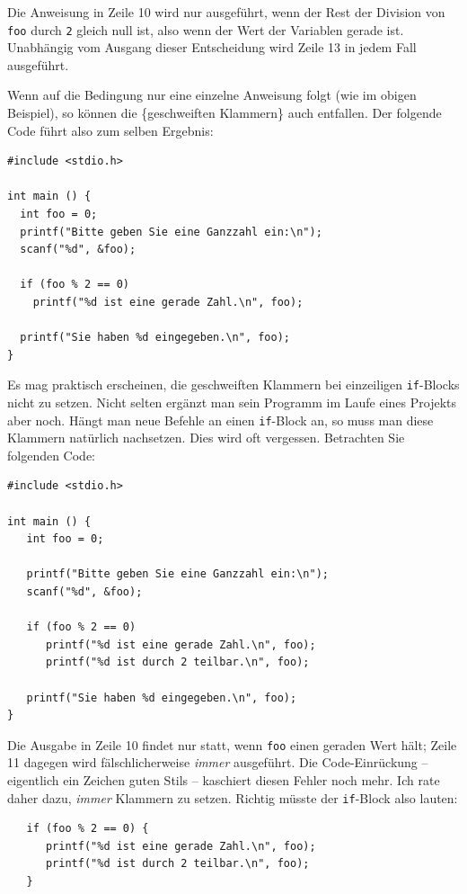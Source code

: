 Die Anweisung in Zeile 10 wird nur ausgeführt, wenn der Rest der Division von \texttt{foo} durch \texttt{2} gleich null ist, also wenn der Wert der Variablen gerade ist. Unabhängig vom Ausgang dieser Entscheidung wird Zeile 13 in jedem Fall ausgeführt.

Wenn auf die Bedingung nur eine einzelne Anweisung folgt (wie im obigen Beispiel), so können die \{geschweiften Klammern\} auch entfallen. Der folgende Code führt also zum selben Ergebnis:

\begin{codebox}
\begin{verbatim}
#include <stdio.h>

int main () {
  int foo = 0;
  printf("Bitte geben Sie eine Ganzzahl ein:\n");
  scanf("%d", &foo);

  if (foo % 2 == 0)
    printf("%d ist eine gerade Zahl.\n", foo);

  printf("Sie haben %d eingegeben.\n", foo);
}
\end{verbatim}
\end{codebox}

\begin{warnbox}
Es mag praktisch erscheinen, die geschweiften Klammern bei einzeiligen \texttt{if}-Blocks nicht zu setzen. Nicht selten ergänzt man sein Programm im Laufe eines Projekts aber noch. Hängt man neue Befehle an einen \texttt{if}-Block an, so muss man diese Klammern natürlich nachsetzen. Dies wird oft vergessen. Betrachten Sie folgenden Code:

\begin{warnbox}[Beispiel: Fehlerhafter \texttt{if}-Block durch fehlende Klammern, leftupper=7mm]
\begin{verbatim}
#include <stdio.h>

int main () {
   int foo = 0;

   printf("Bitte geben Sie eine Ganzzahl ein:\n");
   scanf("%d", &foo);

   if (foo % 2 == 0)
      printf("%d ist eine gerade Zahl.\n", foo);
      printf("%d ist durch 2 teilbar.\n", foo);

   printf("Sie haben %d eingegeben.\n", foo);
}
\end{verbatim}
\end{warnbox}

Die Ausgabe in Zeile 10 findet nur statt, wenn \texttt{foo} einen geraden Wert hält; Zeile 11 dagegen wird fälschlicherweise \emph{immer} ausgeführt. Die Code-Einrückung -- eigentlich ein Zeichen guten Stils -- kaschiert diesen Fehler noch mehr. Ich rate daher dazu, \emph{immer} Klammern zu setzen. Richtig müsste der \texttt{if}-Block also lauten:

\begin{codebox}
\begin{verbatim}
   if (foo % 2 == 0) {
      printf("%d ist eine gerade Zahl.\n", foo);
      printf("%d ist durch 2 teilbar.\n", foo);
   }
\end{verbatim}
\end{codebox}
\end{warnbox}

